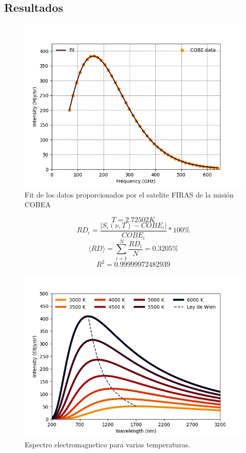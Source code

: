 \documentclass[12pt,letterpaper]{article}
\begin{document}
\begin{multicols}{2}
\section*{Resultados}
\begin{figure}[H]
    \includegraphics[scale=0.45]{../Graphics/fit.png}
    \caption{Fit de los datos proporcionados por el satelite FIRAS de la misión COBEA}
    \label{fit}
    \end{figure}
\begin{equation*}
    T=2.72502K
\end{equation*}
\begin{equation*}
    RD_i = \frac{|S_i(\nu,T)-COBE_i|}{COBE_i}*100\%
\end{equation*}
\begin{equation*}
    \langle RD \rangle = \sum\limits_{i=1}^N \frac{RD_i}{N} = 0.3205\%
\end{equation*}
\begin{equation*}
    R^2=0.99999972482939
    \label{coef_deter}
\end{equation*}
\begin{figure}[H]
    \includegraphics[scale=0.45]{../Graphics/black_body.png}
    \caption{Espectro electromagnetico para varias temperaturas.}
    \end{figure}

\end{multicols}
\end{document}
